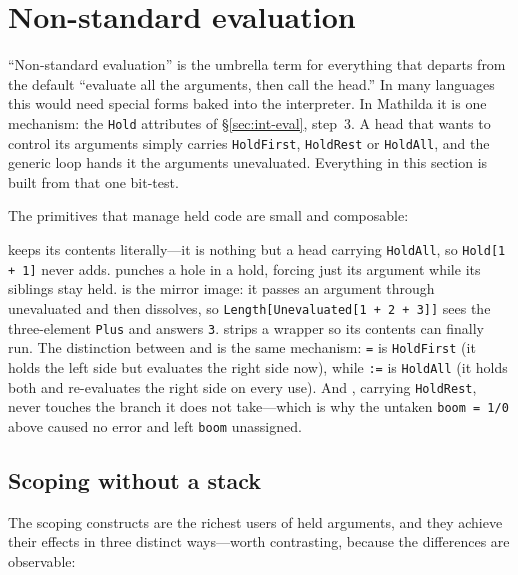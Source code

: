 \section{Non-standard evaluation}
\label{sec:int-nonstd}

``Non-standard evaluation'' is the umbrella term for everything that departs from the
default ``evaluate all the arguments, then call the head.'' In many languages this
would need special forms baked into the interpreter. In Mathilda it is one mechanism:
the \texttt{Hold} attributes of \S\ref{sec:int-eval}, step~3. A head that wants to
control its arguments simply carries \texttt{HoldFirst}, \texttt{HoldRest} or
\texttt{HoldAll}, and the generic loop hands it the arguments unevaluated. Everything
in this section is built from that one bit-test.


The primitives that manage held code are small and composable:


 keeps its contents literally---it is nothing but a head carrying
\texttt{HoldAll}, so \texttt{Hold[1 + 1]} never adds.  punches a hole in a
hold, forcing just its argument while its siblings stay held.  is the
mirror image: it passes an argument through unevaluated and then dissolves, so
\texttt{Length[Unevaluated[1 + 2 + 3]]} sees the three-element \texttt{Plus} and
answers \texttt{3}.  strips a wrapper so its contents can finally run.
The distinction between  and  is the same mechanism: \texttt{=}
is \texttt{HoldFirst} (it holds the left side but evaluates the right side now), while
\texttt{:=} is \texttt{HoldAll} (it holds both and re-evaluates the right side on every
use). And , carrying \texttt{HoldRest}, never touches the branch it does not
take---which is why the untaken \texttt{boom = 1/0} above caused no error and left
\texttt{boom} unassigned.

\subsection*{Scoping without a stack}

The scoping constructs are the richest users of held arguments, and they achieve their
effects in three distinct ways---worth contrasting, because the differences are
observable:


